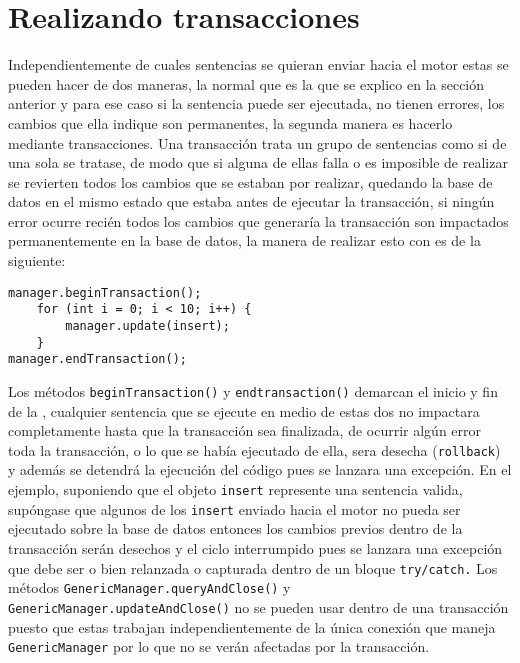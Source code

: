 \section{Realizando transacciones}
Independientemente de cuales sentencias se quieran enviar hacia el motor estas se pueden hacer de dos maneras, la normal que es la que se explico en la sección anterior y para ese caso si la  sentencia puede ser ejecutada, no tienen errores, los cambios que ella indique son permanentes, la segunda manera es hacerlo mediante transacciones. Una transacción trata un grupo de sentencias como si de una sola se tratase, de modo que si alguna de ellas falla o es imposible de realizar se revierten todos los cambios que se estaban por realizar, quedando la base de datos en el mismo estado que estaba antes de ejecutar la transacción, si ningún error ocurre recién todos los cambios que generaría la transacción son impactados permanentemente en la base de datos, la manera de realizar esto con \jj es de la siguiente:
%
\begin{lstlisting}[title=Realizando una transacción]
manager.beginTransaction();
	for (int i = 0; i < 10; i++) {
		manager.update(insert);
	}
manager.endTransaction();
\end{lstlisting}
%
Los métodos \verb=beginTransaction()= y \verb=endtransaction()= demarcan el inicio y fin de la , cualquier sentencia que se ejecute en medio de estas dos no impactara completamente hasta que la transacción sea finalizada, de ocurrir algún error toda la transacción, o lo que se había ejecutado de ella, sera desecha (\verb=rollback=) y además se detendrá la ejecución del código pues se lanzara una excepción. En el ejemplo, suponiendo que el objeto \verb=insert= represente una sentencia valida, supóngase que  algunos de los \verb=insert= enviado hacia el motor no pueda ser ejecutado sobre la base de datos entonces los cambios previos dentro de la transacción serán desechos y el ciclo interrumpido pues se lanzara una excepción que debe ser o  bien relanzada o capturada dentro de un bloque \verb=try/catch.= Los métodos \verb=GenericManager.queryAndClose()= y \verb=GenericManager.updateAndClose()= no se pueden usar dentro de una transacción puesto que estas trabajan independientemente de la única conexión  que maneja \verb=GenericManager= por lo que no se verán afectadas por la transacción.
%
